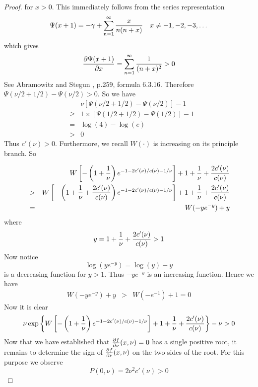\documentclass[11pt,a4]{amsart}
\newcommand{\pd}{\partial}
\newcommand{\1}{{\mathbf 1}}
\begin{document}
\begin{proof}
\begin{minipage}{0.5\textwidth}
    for $x > 0$. This immediately follows from the series
    representation
    \[
    \Psi(x + 1) = -\gamma + \sum_{n=1}^\infty {x \over n(n + x)}
    \quad x \neq -1, -2, -3,\dots
    \]
    which gives
    \[
    {\pd \Psi(x + 1) \over \pd x}
    = \sum_{n=1}^\infty {1 \over (n + x)^2} > 0
    \]
    See Abramowitz and Stegun \cite{abramowitz1972handbook}, p.259,
    formula 6.3.16. Therefore $\Psi(\nu/2 + 1/2) - \Psi(\nu/2) > 0$.
    So we have
    \begin{eqnarray*}
      && \nu \left[
        \Psi(\nu/2 + 1/2) - \Psi(\nu/2)
      \right] - 1 \\
      &\geq& 1 \times \left[
        \Psi(1/2 + 1/2) - \Psi(1/2)
      \right] - 1 \\
      &=& \log(4) - \log(e) \\
      &>& 0
    \end{eqnarray*}
    Thus $c'(\nu) > 0$. Furthermore, we recall
    $W(\cdot)$ is increasing on its principle branch. So
  \end{minipage}
  \begin{eqnarray*}
    &&
    W\left[
      -\left( 1 + {1 \over \nu} \right)
      e^{-1 - 2 c'(\nu)/c(\nu) - 1/\nu}
    \right]
    + 1 + {1 \over \nu} + {2 c'(\nu) \over c(\nu)} \\
    &>& 
    W\left[
      -\left( 1 + {1 \over \nu} + {2 c'(\nu) \over c(\nu)} \right)
      e^{-1 - 2 c'(\nu)/c(\nu) - 1/\nu}
    \right]
    + 1 + {1 \over \nu} + {2 c'(\nu) \over c(\nu)} \\
    &=& W(-y e^{-y}) + y
  \end{eqnarray*}
  where
  \[
  y = 1 + {1 \over \nu} + {2 c'(\nu) \over c(\nu)} > 1
  \]
  Now notice
  \[
  \log(y e^{-y}) = \log(y) - y
  \]
  is a decreasing function for $y > 1$. Thus $-y e^{-y}$ is an
  increasing function. Hence we have
  \begin{eqnarray*}
    W(-y e^{-y}) + y &>& W(-e^{-1}) + 1 = 0
  \end{eqnarray*}
  Now it is clear
  \[
  \nu\exp\left\{
    W\left[
      -\left(1 + {1 \over \nu}\right)
      e^{-1 - 2 c'(\nu)/c(\nu) - 1/\nu}
    \right]
    + 1 + {1 \over \nu} + {2 c'(\nu) \over c(\nu)}
  \right\} - \nu > 0
  \]
  Now that we have established that ${\pd f \over \pd \nu}(x, \nu) = 0$ has a
  single positive root, it remains to determine the sign of
  ${\pd f \over \pd \nu}(x, \nu)$ on the two sides of the root. For this purpose
  we observe
  \begin{equation}
    \label{eq:xxie5.1}
    P(0, \nu) = 2 \nu^2 c'(\nu) > 0

\end{equation}
\end{proof}
\end{document}

